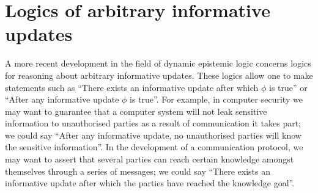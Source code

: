
\section{Logics of arbitrary informative updates}

A more recent development in the field of dynamic epistemic logic concerns
logics for reasoning about arbitrary informative updates. These logics allow one
to make statements such as ``There exists an informative update after which
$\phi$ is true'' or ``After any informative update $\phi$ is true''. For
example, in computer security we may want to guarantee that a computer system
will not leak sensitive information to unauthorised parties as a result of
communication it takes part; we could say ``After any informative update, no
unauthorised parties will know the sensitive information''. In the development
of a communication protocol, we may want to assert that several parties can
reach certain knowledge amongst themselves through a series of messages; we
could say ``There exists an informative update after which the parties have
reached the knowledge goal''. 

